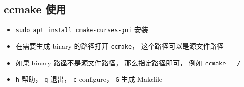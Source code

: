 \subsection{ccmake 使用}
\begin{itemize}
\item \verb`sudo apt install cmake-curses-gui` 安装
\item 在需要生成 binary 的路径打开 \verb`ccmake`， 这个路径可以是源文件路径
\item 如果 binary 路径不是源文件路径， 那么指定路径即可， 例如 \verb`ccmake ../`
\item \verb`h` 帮助， \verb`q` 退出， \verb`c` configure， \verb`G` 生成 Makefile
\end{itemize}
